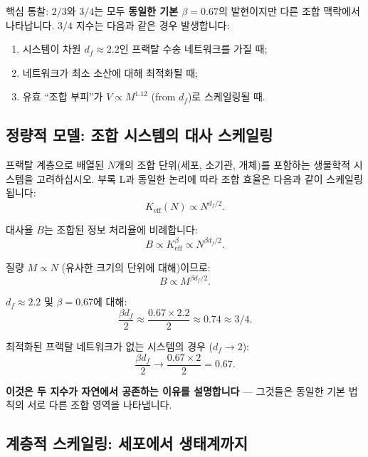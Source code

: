\documentclass[11pt,a4paper]{article}
\newcommand{\Keff}{K_{\mathrm{eff}}}
\begin{document}
	핵심 통찰: \(2/3\)와 \(3/4\)는 모두 \textbf{동일한 기본 \(\beta = 0.67\)}의 발현이지만 다른 조합 맥락에서 나타납니다. \(3/4\) 지수는 다음과 같은 경우 발생합니다:
	\begin{enumerate}
		\item 시스템이 차원 \(d_f \approx 2.2\)인 프랙탈 수송 네트워크를 가질 때;
		\item 네트워크가 최소 소산에 대해 최적화될 때;
		\item 유효 ``조합 부피''가 \(V \propto M^{1.12}\) (from \(d_f\))로 스케일링될 때.
	\end{enumerate}
	
	\subsection{정량적 모델: 조합 시스템의 대사 스케일링}
	
	프랙탈 계층으로 배열된 \(N\)개의 조합 단위(세포, 소기관, 개체)를 포함하는 생물학적 시스템을 고려하십시오. 부록 L과 동일한 논리에 따라 조합 효율은 다음과 같이 스케일링됩니다:
	\begin{equation}
		\Keff(N) \propto N^{d_f/2}.
	\end{equation}
	
	대사율 \(B\)는 조합된 정보 처리율에 비례합니다:
	\begin{equation}
		B \propto \Keff^{\beta} \propto N^{\beta d_f/2}.
	\end{equation}
	
	질량 \(M \propto N\) (유사한 크기의 단위에 대해)이므로:
	\begin{equation}
		B \propto M^{\beta d_f/2}.
	\end{equation}
	
	\(d_f \approx 2.2\) 및 \(\beta = 0.67\)에 대해:
	\begin{equation}
		\frac{\beta d_f}{2} \approx \frac{0.67 \times 2.2}{2} \approx 0.74 \approx 3/4.
	\end{equation}
	
	최적화된 프랙탈 네트워크가 없는 시스템의 경우 (\(d_f \to 2\)):
	\begin{equation}
		\frac{\beta d_f}{2} \to \frac{0.67 \times 2}{2} = 0.67.
	\end{equation}
	
	\textbf{이것은 두 지수가 자연에서 공존하는 이유를 설명합니다} — 그것들은 동일한 기본 법칙의 서로 다른 조합 영역을 나타냅니다.
	
	\subsection{계층적 스케일링: 세포에서 생태계까지}
	
\end{document}
